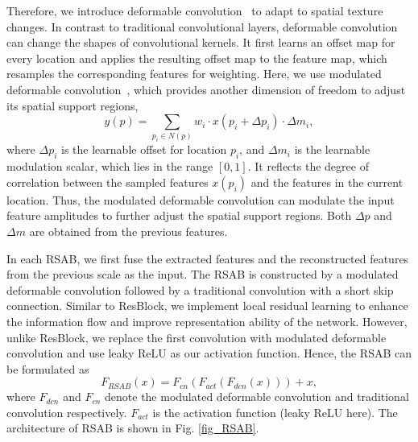 \documentclass[runningheads]{llncs}
\begin{document}
Therefore, we introduce deformable convolution~\cite{dai2017deformable,zhu2019deformable} to adapt to spatial texture changes. In contrast to traditional convolutional layers, deformable convolution can change the shapes of convolutional kernels. It first learns an offset map for every location and applies the resulting offset map to the feature map, which resamples the corresponding features for weighting. Here, we use modulated deformable convolution~\cite{zhu2019deformable}, which provides another dimension of freedom to adjust its spatial support regions, 
\begin{equation}
   y(p) = \sum_{p_i\in N(p)} w_i \cdot x(p_i+\Delta p_i) \cdot \Delta m_i,
\end{equation}
where $\Delta p_i$ is the learnable offset for location $p_i$, and $\Delta m_i$ is the learnable modulation scalar, which lies in the range $[0,1]$. It reflects the degree of correlation between the sampled features $x(p_i)$ and the features in the current location. Thus, the modulated deformable convolution can modulate the input feature amplitudes to further adjust the spatial support regions. Both $\Delta p$ and $\Delta m$ are obtained from the previous features. 

In each RSAB, we first fuse the extracted features and the reconstructed features from the previous scale as the input. The RSAB is constructed by a modulated deformable convolution followed by a traditional convolution with a short skip connection. Similar to ResBlock, we implement local residual learning to enhance the information flow and improve representation ability of the network. However, unlike ResBlock, we replace the first convolution with modulated deformable convolution and use leaky ReLU as our activation function. Hence, the RSAB can be formulated as
\begin{equation}
    F_{RSAB}(x) = F_{cn}(F_{act}(F_{dcn}(x))) + x,
\end{equation}
where $F_{dcn}$ and $F_{cn}$ denote the modulated deformable convolution and traditional convolution respectively. $F_{act}$ is the activation function (leaky ReLU here). The architecture of RSAB is shown in Fig. \ref{fig_RSAB}.
\end{document}
